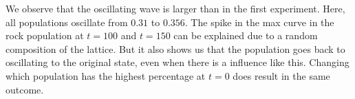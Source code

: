 \documentclass[a4paper, 11pt]{article}
\begin{document}
\begin{landscape}
We observe that the oscillating wave is larger than in the first experiment. Here, all populations oscillate from $0.31$ to $0.356$. The spike in the max curve in the rock population at $t=100$ and $t=150$ can be explained due to a random composition of the lattice. But it also shows us that the population goes back to oscillating to the original state, even when there is a influence like this. Changing which population has the highest percentage at $t=0$ does result in the same outcome.

\end{landscape}
\end{document}
